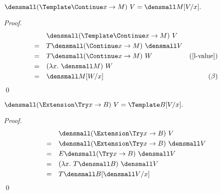 \begin{theorem}[]
    $ \den{(\Template \Continue x \to M) ~ V} = \den{M\subst{x}{V}}.$
    \begin{proof}
        \begin{align*}
            &\quad \den{(\Template \Continue x \to M) ~ V} \\
            =& \quad T\den{(\Continue x \to M)} ~ \den{V}\\
            =& \quad T\den{(\Continue x \to M)} ~ W & (\cref{l-value})\\
            =& \quad (\lambda x. ~\den{M}) ~ W \\
            =& \quad \den{M}\subst{x}{W} & (\beta)
        \end{align*}
        \qed
    \end{proof}
\end{theorem}


\begin{theorem}[]
    $ \den{(\Extension \Try x \to B) ~ V} = \Template B\subst{x}{V}.$
    \begin{proof}
        \begin{align*}
            &\quad \den{(\Extension \Try x \to B) ~ V}  \\
            =& \quad \den{(\Extension \Try x \to B)} ~ \den{V}\\
            =& \quad E\den{(\Try x \to B)} ~ \den{V}\\
            =& \quad (\lambda x. ~T\den{B}) ~ \den{V}\\
            =& \quad T\den{B}\subst{x}{\den{V}}
        \end{align*}
        \qed
    \end{proof}
\end{theorem}

